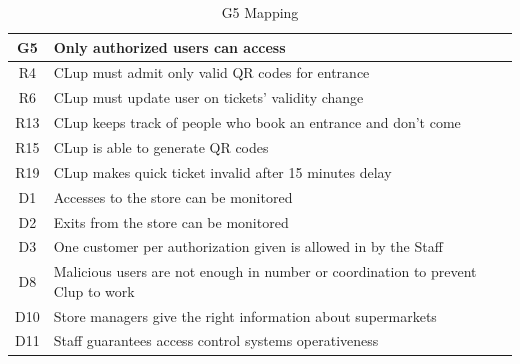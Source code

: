 \begin{table}[H]
	\begin{tabular}{c|l}
		\cellcolor{lightgray}\textbf{G5} & \textbf{Only authorized users can access}\\
		\hline
		\cellcolor{YellowGreen} R4 & CLup must admit only valid QR codes for entrance \\
		\hline
		\cellcolor{YellowGreen} R6 & CLup must update user on tickets' validity change\\
		\hline
		\cellcolor{YellowGreen} R13 & CLup keeps track of people who book an entrance and don’t come\\
		\hline
		\cellcolor{YellowGreen} R15 & CLup is able to generate QR codes\\
		\hline
		\cellcolor{YellowGreen} R19 & CLup makes quick ticket invalid after 15 minutes delay\\
		\hline
		\cellcolor{YellowOrange} D1 & Accesses to the store can be monitored\\
		\hline
		\cellcolor{YellowOrange} D2 & Exits from the store can be monitored\\
		\hline
		\cellcolor{YellowOrange} D3 & One customer per authorization given is allowed in by the Staff\\
		\hline
		\cellcolor{YellowOrange} D8 & Malicious users are not enough in number or coordination to prevent Clup to work\\
		\hline
		\cellcolor{YellowOrange} D10 & Store managers give the right information about supermarkets\\
		\hline
		\cellcolor{YellowOrange} D11 & Staff guarantees access control systems operativeness\\
	\end{tabular}
	\label{tab:G5Mapping}
	\caption{G5 Mapping}
\end{table}

